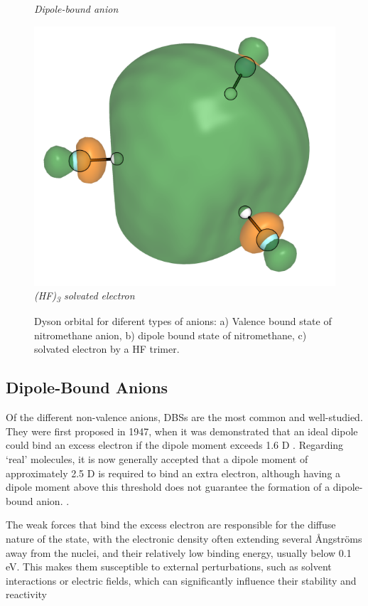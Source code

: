 \begin{figure}[h]
\begin{minipage}[b]{0.30\textwidth}
    \small\emph{Dipole-bound anion}
  \end{minipage}
  \hfill
  \begin{minipage}[b]{0.27\textwidth}
    \centering
    \includegraphics[width=\textwidth]{chapters/introduction/image/hf3.png}
    \small\emph{(HF)\textsubscript{3} solvated electron}
  \end{minipage}
  \caption[Valence and Non-Valence Anions]{Dyson orbital for diferent types of anions: a) Valence bound state of nitromethane anion, b) dipole bound state of nitromethane, c) solvated electron by a HF trimer.}
  \label{fig:AnionTypes}
\end{figure}

\subsection{Dipole-Bound Anions}
Of the different non-valence anions, DBSs are the most common and well-studied. They were first proposed in 1947, when it was demonstrated that an ideal dipole could bind an excess electron if the dipole moment exceeds 1.6 D \cite{fermi1947capture}. Regarding `real' molecules, it is now generally accepted that a dipole moment of approximately 2.5 D is required to bind an extra electron, although having a dipole moment above this threshold does not guarantee the formation of a dipole-bound anion. \cite{jordan2003theory}.

The weak forces that bind the excess electron are responsible for the diffuse nature of the state, with the electronic density often extending several \r{A}ngstr{\"o}ms away from the nuclei, and their relatively low binding energy, usually below 0.1 eV. This makes them susceptible to external perturbations, such as solvent interactions or electric fields, which can significantly influence their stability and reactivity \cite{schiedt1998anion,jalbout2001dipole,gutowski2002solvated,jordan2003theory,eustis2007photoelectron,simons2008molecular,herbert2015quantum,clarke2025role}

